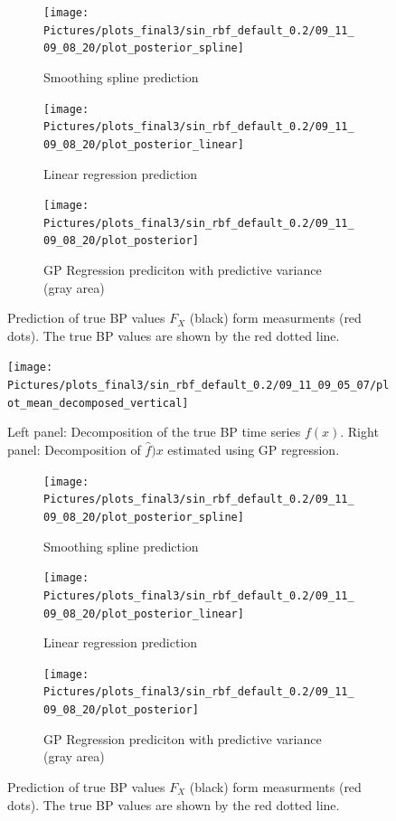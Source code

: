 \begin{figure}[!ht]
\centering

\begin{subfigure}{.45\textwidth}
    \centering
    \texttt{[image: Pictures/plots\_final3/sin\_rbf\_default\_0.2/09\_11\_09\_08\_20/plot\_posterior\_spline]}
  \caption[Spline]{Smoothing spline prediction}
  \label{fig:ex2-spline}
\end{subfigure}\hfill
\begin{subfigure}{.45\textwidth}
    \centering
    \texttt{[image: Pictures/plots\_final3/sin\_rbf\_default\_0.2/09\_11\_09\_08\_20/plot\_posterior\_linear]}
  \caption[Linear Regression]{Linear regression prediction}
  \label{fig:ex2-linear}
\end{subfigure}
\begin{subfigure}{0.6\textwidth}
    \centering
    \texttt{[image: Pictures/plots\_final3/sin\_rbf\_default\_0.2/09\_11\_09\_08\_20/plot\_posterior]}
  \caption[GP Prediction]{GP Regression prediciton with predictive variance (gray area)}
  \label{fig:ex2-gp}
\end{subfigure}
\caption[True BP value prediction]{Prediction of true BP values $F_X$ (black) form measurments (red dots). The true BP values are shown
by the red dotted line. }
\label{fig:ex2}
\end{figure}



\begin{figure}[!ht]
\centering
    \texttt{[image: Pictures/plots\_final3/sin\_rbf\_default\_0.2/09\_11\_09\_05\_07/plot\_mean\_decomposed\_vertical]}
\caption[Decomposed BP time sereis]{Left panel: Decomposition of the true BP time series $f(x)$. Right panel:
Decomposition of $\hat{f})x$ estimated using GP regression.}
\label{fig:ex2-gp-prediction}
\end{figure}

\begin{figure}[!ht]
\centering
\begin{subfigure}{.45\textwidth}
    \centering
    \texttt{[image: Pictures/plots\_final3/sin\_rbf\_default\_0.2/09\_11\_09\_08\_20/plot\_posterior\_spline]}
  \caption[Spline]{Smoothing spline prediction}
  \label{fig:ex2-spline}
\end{subfigure}\hfill
\begin{subfigure}{.45\textwidth}
    \centering
    \texttt{[image: Pictures/plots\_final3/sin\_rbf\_default\_0.2/09\_11\_09\_08\_20/plot\_posterior\_linear]}
  \caption[Linear Regression]{Linear regression prediction}
  \label{fig:ex2-linear}
\end{subfigure}
\begin{subfigure}{0.6\textwidth}
    \centering
    \texttt{[image: Pictures/plots\_final3/sin\_rbf\_default\_0.2/09\_11\_09\_08\_20/plot\_posterior]}
  \caption[GP Prediction]{GP Regression prediciton with predictive variance (gray area)}
  \label{fig:ex2-gp}
\end{subfigure}
\caption[True BP value prediction]{Prediction of true BP values $F_X$ (black) form measurments (red dots). The true BP values are shown
by the red dotted line. }
\label{fig:ex2}
\end{figure}



